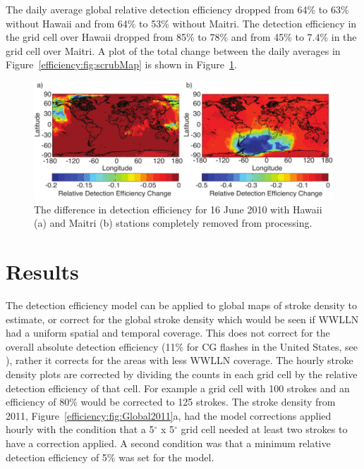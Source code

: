 The daily average global relative detection efficiency dropped from 64\% to 63\% without Hawaii and from 64\% to 53\% without Maitri.
The detection efficiency in the grid cell over Hawaii dropped from 85\% to 78\% and from 45\% to 7.4\% in the grid cell over Maitri.
A plot of the total change between the daily averages in Figure~\ref{efficiency:fig:scrubMap} is shown in Figure~\ref{efficiency:fig:scrub}.

\begin{figure}[ht!]
   \centering
\noindent\includegraphics[scale=1]{efficiency/Figures/2012RS005049-p13.pdf}
\caption{The difference in detection efficiency for 16 June 2010 with Hawaii (a) and Maitri (b) stations completely removed from processing.}
\label{efficiency:fig:scrub}
\end{figure}

\section{Results}

The detection efficiency model can be applied to global maps of stroke density to estimate, or correct for the global stroke density which would be seen if WWLLN had a uniform spatial and temporal coverage.
This does not correct for the overall absolute detection efficiency (11\% for CG flashes in the United States, see \citet{Abarca2010}), rather it corrects for the areas with less WWLLN coverage.
The hourly stroke density plots are corrected by dividing the counts in each grid cell by the relative detection efficiency of that cell.
For example a grid cell with 100 strokes and an efficiency of 80\% would be corrected to 125 strokes.
The stroke density from 2011, Figure~\ref{efficiency:fig:Global2011}a, had the model corrections applied hourly with the condition that a 5$^\circ$ x 5$^\circ$ grid cell needed at least two strokes to have a correction applied.
A second condition was that a minimum relative detection efficiency of 5\% was set for the model.

